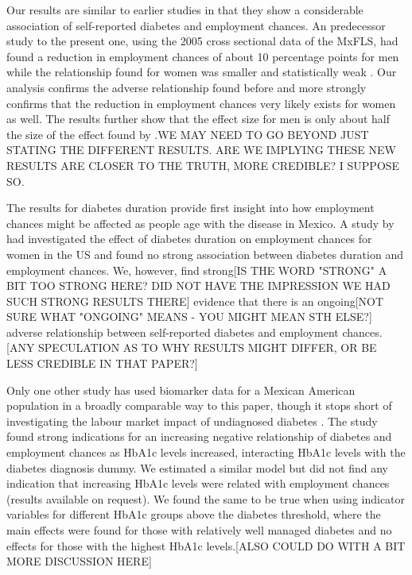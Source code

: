 Our results are similar to earlier studies in that they show a considerable
association of self-reported diabetes and employment chances. An predecessor 
study to the present one, using the 2005 cross sectional data of
the \ac{MxFLS}, had found a reduction in employment chances of about
10 percentage points for men while the relationship found for women
was smaller and statistically weak \citep{Seuring2015}. Our analysis
confirms the adverse relationship found before and more strongly confirms
that the reduction in employment chances very likely exists for women
as well. The results further show that the effect size for men is
only about half the size of the effect found by \citet{Seuring2015}.WE MAY NEED TO GO BEYOND JUST STATING THE DIFFERENT RESULTS. ARE WE IMPLYING THESE NEW RESULTS ARE CLOSER TO THE TRUTH, MORE CREDIBLE? I SUPPOSE SO. 

The results for diabetes duration provide first insight into how employment
chances might be affected as people age with the disease in Mexico.
A study by \citet{Minor2013} had investigated the effect of diabetes
duration on employment chances for women in the US and found no strong
association between diabetes duration and employment chances. We,
however, find strong[IS THE WORD "STRONG" A BIT TOO STRONG HERE? DID NOT HAVE THE IMPRESSION WE HAD SUCH STRONG RESULTS THERE] evidence that there is an ongoing[NOT SURE WHAT "ONGOING" MEANS - YOU MIGHT MEAN STH ELSE?] adverse relationship
 between self-reported diabetes and employment chances. [ANY SPECULATION AS TO WHY RESULTS MIGHT DIFFER, OR BE LESS CREDIBLE IN THAT PAPER?] 

Only one other study has used biomarker data for a Mexican American
population in a broadly comparable way to this paper, though it stops short of investigating
the labour market impact of undiagnosed diabetes \citep{BrownIII2011}. The study found strong indications
for an increasing negative relationship of diabetes and employment
chances as \ac{HbA1c} levels increased, interacting \ac{HbA1c} levels
with the diabetes diagnosis dummy. We estimated a similar model but
did not find any indication that increasing \ac{HbA1c} levels were
related with employment chances (results available on request). We
found the same to be true when using indicator variables for different
\ac{HbA1c} groups above the diabetes threshold, where the main effects
were found for those with relatively well managed diabetes and no
effects for those with the highest \ac{HbA1c} levels.[ALSO COULD DO WITH A BIT MORE DISCUSSION HERE]

